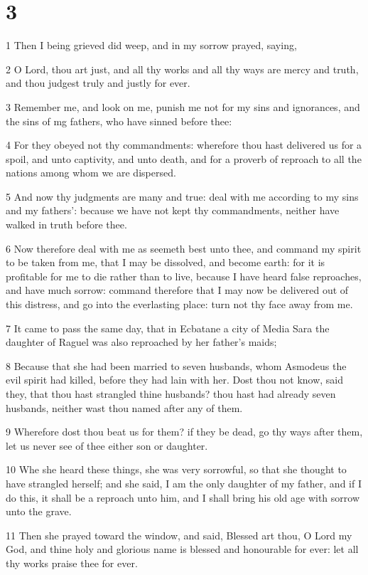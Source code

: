 \chapter{3}

\par 1 Then I being grieved did weep, and in my sorrow prayed, saying,
\par 2 O Lord, thou art just, and all thy works and all thy ways are mercy and truth, and thou judgest truly and justly for ever.
\par 3 Remember me, and look on me, punish me not for my sins and ignorances, and the sins of mg fathers, who have sinned before thee:
\par 4 For they obeyed not thy commandments: wherefore thou hast delivered us for a spoil, and unto captivity, and unto death, and for a proverb of reproach to all the nations among whom we are dispersed.
\par 5 And now thy judgments are many and true: deal with me according to my sins and my fathers': because we have not kept thy commandments, neither have walked in truth before thee.
\par 6 Now therefore deal with me as seemeth best unto thee, and command my spirit to be taken from me, that I may be dissolved, and become earth: for it is profitable for me to die rather than to live, because I have heard false reproaches, and have much sorrow: command therefore that I may now be delivered out of this distress, and go into the everlasting place: turn not thy face away from me.
\par 7 It came to pass the same day, that in Ecbatane a city of Media Sara the daughter of Raguel was also reproached by her father's maids;
\par 8 Because that she had been married to seven husbands, whom Asmodeus the evil spirit had killed, before they had lain with her. Dost thou not know, said they, that thou hast strangled thine husbands? thou hast had already seven husbands, neither wast thou named after any of them.
\par 9 Wherefore dost thou beat us for them? if they be dead, go thy ways after them, let us never see of thee either son or daughter.
\par 10 Whe she heard these things, she was very sorrowful, so that she thought to have strangled herself; and she said, I am the only daughter of my father, and if I do this, it shall be a reproach unto him, and I shall bring his old age with sorrow unto the grave.
\par 11 Then she prayed toward the window, and said, Blessed art thou, O Lord my God, and thine holy and glorious name is blessed and honourable for ever: let all thy works praise thee for ever.
